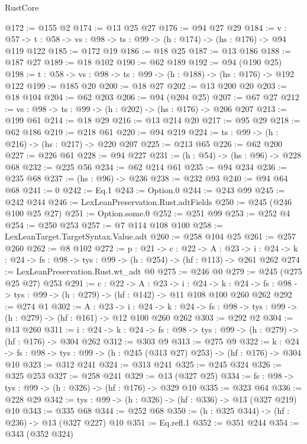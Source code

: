 \begin{lexlean}{RustCore}
\begin{coremodule}
@172 := @155 @2
@174 := @13 @25 @27
@176 := @94 @27 @29
@184 := {v : @57} ->
  {t : @58} -> {vs : @98} -> {ts : @99} -> (h : @174) -> (hs : @176) -> @94 @119 @122
@185 := @172 @19
@186 := @18 @25
@187 := @13 @186
@188 := @187 @27
@189 := @18 @102
@190 := @62 @189
@192 := @94 (@190 @25)
@198 := {t : @58} -> {vs : @98} -> {ts : @99} -> (h : @188) -> (hs : @176) -> @192 @122
@199 := @185 @20
@200 := @18 @27
@202 := @13 @200 @20
@203 := @18 @104
@204 := @62 @203
@206 := @94 (@204 @25)
@207 := @67 @27
@212 := {vs : @98} -> {ts : @99} -> (h : @202) -> (hs : @176) -> @206 @207
@213 := @199 @61
@214 := @18 @29
@216 := @13 @214 @20
@217 := @95 @29
@218 := @62 @186
@219 := @218 @61
@220 := @94 @219
@224 := {ts : @99} -> (h : @216) -> (hs : @217) -> @220 @207
@225 := @213 @65
@226 := @62 @200
@227 := @226 @61
@228 := @94 @227
@231 := (h : @54) -> (hs : @96) -> @228 @68
@232 := @225 @56
@234 := @62 @214 @61
@235 := @94 @234
@236 := @235 @68
@237 := (hs : @96) -> @236
@238 := @232 @93
@240 := @94 @64 @68
@241 := 0
@242 := Eq.{1}
@243 := Option.{0}
@244 := @243 @99
@245 := @242 @244
@246 := LexLeanPreservation.Rust.adtFields
@250 := @245 (@246 @100 @25 @27)
@251 := Option.some.{0}
@252 := @251 @99
@253 := @252 @4
@254 := @250 @253
@257 := @7 @114 @108 @100
@258 := LexLeanTarget.TargetSyntax.Value.adt
@260 := @258 @104 @25
@261 := @257 @260
@262 := @8 @102
@272 := {p : @21} ->
  {c : @22} ->
  {A : @23} ->
  {i : @24} -> {k : @24} -> {fs : @98} -> {tys : @99} -> (h : @254) -> (hf : @113) -> @261 @262
@274 := LexLeanPreservation.Rust.wt_adt @0
@275 := @246 @0
@279 := @245 (@275 @25 @27) @253
@291 := {c : @22} ->
  {A : @23} ->
  {i : @24} ->
  {k : @24} -> {fs : @98} -> {tys : @99} -> (h : @279) -> (hf : @142) -> @11 @108 @100 @260 @262
@292 := @274 @1
@302 := {A : @23} ->
  {i : @24} ->
  {k : @24} -> {fs : @98} -> {tys : @99} -> (h : @279) -> (hf : @161) -> @12 @100 @260 @262
@303 := @292 @2
@304 := @13 @260
@311 := {i : @24} ->
  {k : @24} -> {fs : @98} -> {tys : @99} -> (h : @279) -> (hf : @176) -> @304 @262
@312 := @303 @9
@313 := @275 @9
@322 := {k : @24} ->
  {fs : @98} -> {tys : @99} -> (h : @245 (@313 @27) @253) -> (hf : @176) -> @304 @10
@323 := @312 @241
@324 := @313 @241
@325 := @245 @324
@326 := @325 @253
@327 := @258 @241
@329 := @13 (@327 @25)
@334 := {fs : @98} -> {tys : @99} -> (h : @326) -> (hf : @176) -> @329 @10
@335 := @323 @64
@336 := @228 @29
@342 := {tys : @99} -> (h : @326) -> (hf : @336) -> @13 (@327 @219) @10
@343 := @335 @68
@344 := @252 @68
@350 := (h : @325 @344) -> (hf : @236) -> @13 (@327 @227) @10
@351 := Eq.refl.{1}
@352 := @351 @244
@354 := @343 (@352 @324)

\end{coremodule}
\end{lexlean}
